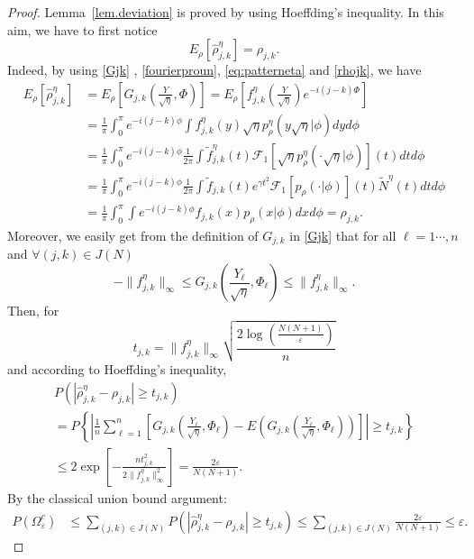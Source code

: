 \documentclass[a4paper]{amsart}
\newcommand{\paren}[1]{{\left( #1 \right)}} %
\begin{document}
\begin{proof} 
Lemma~\ref{lem.deviation} is proved by using  Hoeffding's inequality. In
this aim, we have to first notice
$$E_\rho[\hat{\rho}^\eta_{j,k}]=\rho_{j,k}.$$
Indeed, by using \eqref{Gjk} , \eqref{fourierproun}, \eqref{eq:patterneta} and
\eqref{rhojk}, we have 
\begin{align*}
        E_\rho[\hat{\rho}^\eta_{j,k}] &=
        E_\rho[G_{j,k}(\frac{Y}{\sqrt\eta},\Phi)] =
        E_\rho[f_{j,k}^{\eta}(\frac{Y}{\sqrt\eta})e^{-i(j-k)\Phi}]
         \\
        & =\frac{1}{\pi}\int_0^\pi e^{-i(j-k)\phi}\int
        f_{j,k}^{\eta}(y)\sqrt{\eta}p_\rho^\eta(y\sqrt{\eta}|\phi)dy
        d\phi\\
        &= \frac{1}{\pi}\int_0^\pi e^{-i(j-k)\phi}\frac{1}{2\pi}\int
        \widetilde{f}_{j,k}^{\eta}(t)
        \mathcal{F}_1[\sqrt{\eta}p_\rho^\eta(\cdot\sqrt{\eta}|\phi)](t)dt
        d\phi\\
        &= \frac{1}{\pi} \int_0^\pi e^{-i(j-k)\phi} \frac{1}{2\pi}
        \int \widetilde{f}_{j,k}(t) e^{\gamma
          t^2} \mathcal{F}_1[p_\rho(\cdot|\phi)](t)
        \widetilde{N}^\eta(t) dt d\phi\\
                &= \frac{1}{\pi}    \int_0^\pi   \int  e^{-i(j-k)\phi} 
    f_{j,k}(x) p_\rho(x|\phi)dx d\phi=\rho_{j,k}.
\end{align*} 
 Moreover, we easily get from the definition of $G_{j,k}$ in \eqref{Gjk} that
for all $\ell=1\cdots,n$ and  $\forall (j,k)\in J(N)$
   $$ - \|f_{j,k}^{\eta}\|_{\infty} \leq
G_{j,k}\paren{\frac{Y_\ell}{\sqrt\eta},\Phi_\ell}\leq\|f_{j,k}^{\eta}\|_{\infty}
.
   $$
Then, for 
   $$
   t_{j,k} =
\|f_{j,k}^{\eta}\|_{\infty}\sqrt{\frac{2\log\left(\frac{N(N+1)}{\varepsilon}
\right)}{n}}%
  $$
  and according to Hoeffding's inequality,
\begin{multline*}
         P \left( \left|   \hat{\rho}^\eta_{j,k} - \rho_{j,k} \right| \geq
t_{j,k}   \right) 
       \\
       = P \left\{ \left| \frac{1}{n}\sum_{\ell=1}^{n}  \left[
G_{j,k}\paren{\frac{Y_\ell}{\sqrt\eta},\Phi_\ell}
        - E \left(G_{j,k}\paren{\frac{Y_\ell}{\sqrt\eta},\Phi_\ell}\right)
\right]\right| \geq t_{j,k}    \right\}
\\
\leq 2 \exp\left[ - \frac{nt_{j,k}^{2}}{2
\|f_{j,k}^{\eta}\|_{\infty}^{2}}\right]
          = \frac{2 \varepsilon}{N(N+1)} .
\end{multline*}
By the classical union bound argument:
 \begin{align*}
          P \left(\Omega_{\varepsilon}^c  \right) 
         & \leq \sum_{ (j,k)\in J(N)} P \left( \left|  \hat{\rho}^\eta_{j,k} -
\rho_{j,k}
         \right| \geq t_{j,k}    \right)\leq \sum_{ (j,k)\in J(N)} \frac{2
\varepsilon}{N(N+1)}\leq \varepsilon .
\end{align*}
\end{proof}
\end{document}
